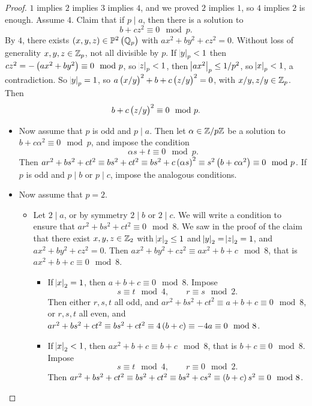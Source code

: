 \begin{proof}
$ 1 $ implies $ 2 $ implies $ 3 $ implies $ 4 $, and we proved $ 2 $ implies $ 1 $, so $ 4 $ implies $ 2 $ is enough. Assume $ 4 $. Claim that if $ p \mid a $, then there is a solution to
$$ b + cz^2 \equiv 0 \mod p. $$
By $ 4 $, there exists $ \br{x, y, z} \in \PP^2\br{\QQ_p} $ with $ ax^2 + by^2 + cz^2 = 0 $. Without loss of generality $ x, y, z \in \mathbb{Z}_p $, not all divisible by $ p $. If $ \abs{y}_p < 1 $ then $ cz^2 = -\br{ax^2 + by^2} \equiv 0 \mod p $, so $ \abs{z}_p < 1 $, then $ \abs{ax^2}_p \le 1 / p^2 $, so $ \abs{x}_p < 1 $, a contradiction. So $ \abs{y}_p = 1 $, so $ a\br{x / y}^2 + b + c\br{z / y}^2 = 0 $, with $ x / y, z / y \in \mathbb{Z}_p $. Then
$$ b + c\br{z / y}^2 \equiv 0 \mod p. $$
\begin{itemize}
\item Now assume that $ p $ is odd and $ p \mid a $. Then let $ \alpha \in \mathbb{Z} / p\mathbb{Z} $ be a solution to $ b + c\alpha^2 \equiv 0 \mod p $, and impose the condition
$$ \alpha s + t \equiv 0 \mod p. $$
Then $ ar^2 + bs^2 + ct^2 \equiv bs^2 + ct^2 \equiv bs^2 + c\br{\alpha s}^2 \equiv s^2\br{b + c\alpha^2} \equiv 0 \mod p $. If $ p $ is odd and $ p \mid b $ or $ p \mid c $, impose the analogous conditions.
\item Now assume that $ p = 2 $.
\begin{itemize}
\item Let $ 2 \mid a $, or by symmetry $ 2 \mid b $ or $ 2 \mid c $. We will write a condition to ensure that $ ar^2 + bs^2 + ct^2 \equiv 0 \mod 8 $. We saw in the proof of the claim that there exist $ x, y, z \in \mathbb{Z}_2 $ with $ \abs{x}_2 \le 1 $ and $ \abs{y}_2 = \abs{z}_2 = 1 $, and $ ax^2 + by^2 + cz^2 = 0 $. Then $ ax^2 + by^2 + cz^2 \equiv ax^2 + b + c \mod 8 $, that is $ ax^2 + b + c \equiv 0 \mod 8 $.
\begin{itemize}
\item If $ \abs{x}_2 = 1 $, then $ a + b + c \equiv 0 \mod 8 $. Impose
$$ s \equiv t \mod 4, \qquad r \equiv s \mod 2. $$
Then either $ r, s, t $ all odd, and $ ar^2 + bs^2 + ct^2 \equiv a + b + c \equiv 0 \mod 8 $, or $ r, s, t $ all even, and $ ar^2 + bs^2 + ct^2 \equiv bs^2 + ct^2 \equiv 4\br{b + c} \equiv -4a \equiv 0 \mod 8 $.
\item If $ \abs{x}_2 < 1 $, then $ ax^2 + b + c \equiv b + c \mod 8 $, that is $ b + c \equiv 0 \mod 8 $. Impose
$$ s \equiv t \mod 4, \qquad r \equiv 0 \mod 2. $$
Then $ ar^2 + bs^2 + ct^2 \equiv bs^2 + ct^2 \equiv bs^2 + cs^2 \equiv \br{b + c}s^2 \equiv 0 \mod 8 $.
\end{itemize}

\end{itemize}
\end{itemize}
\end{proof}

